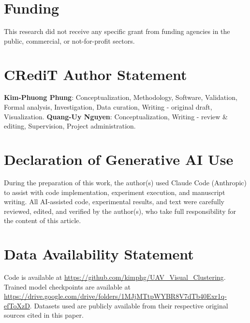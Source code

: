 \documentclass[conference]{IEEEtran}
\begin{document}
\section*{Funding}
This research did not receive any specific grant from funding agencies in
the public, commercial, or not-for-profit sectors.

\section*{CRediT Author Statement}
\textbf{Kim-Phuong Phung}: Conceptualization, Methodology, Software,
Validation, Formal analysis, Investigation, Data curation, Writing -
original draft, Visualization. \textbf{Quang-Uy Nguyen}: Conceptualization,
Writing - review \& editing, Supervision, Project administration.

\section*{Declaration of Generative AI Use}
During the preparation of this work, the author(s) used Claude Code
(Anthropic) to assist with code implementation, experiment execution, and
manuscript writing. All AI-assisted code, experimental results, and text
were carefully reviewed, edited, and verified by the author(s), who take
full responsibility for the content of this article.

\section*{Data Availability Statement}
Code is available at
\url{https://github.com/kimphg/UAV_Visual_Clustering}. Trained model
checkpoints are available at
\url{https://drive.google.com/drive/folders/1MJjMTtpWYBR8V7dTb40Exr1q-efToXzD}.
Datasets used are publicly available from their respective original
sources cited in this paper.



\end{document}
